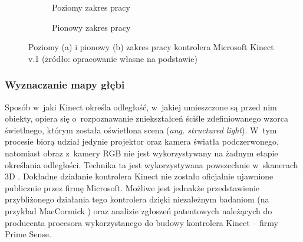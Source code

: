 \begin{savenotes}
	\begin{figure}[!htb]
		\centering
		\begin{subfigure}[b]{0.5\textwidth}
			\centering
			
			\caption{Poziomy zakres pracy}
			\label{fig:kinect:range:a}
		\end{subfigure} \hfill
		\begin{subfigure}[b]{0.6\textwidth}
			\centering
			
			\caption{Pionowy zakres pracy}
			\label{fig:kinect:range:b}
		\end{subfigure} \hfill
		\begin{subfigure}[p]{\textwidth}
			\hfill
			               
		\end{subfigure}
																									
		\caption[Poziomy i pionowy zakres pracy kontrolera Microsoft Kinect v.1]{Poziomy (a) i pionowy (b) zakres pracy kontrolera Microsoft Kinect v.1 (żródło: opracowanie własne na podstawie)}
		\label{fig:characteristics:kinect:range}	
	\end{figure}
\end{savenotes} 
																															
\subsubsection*{Wyznaczanie mapy głębi}
Sposób w~jaki Kinect określa odległość, w~jakiej umieszczone są przed nim obiekty, opiera się o~rozpoznawanie zniekształceń ściśle zdefiniowanego wzorca świetlnego, którym została oświetlona scena (\emph{ang. structured light}). W~tym procesie biorą udział jedynie projektor oraz kamera światła podczerwonego, natomiast obraz z~kamery RGB nie jest wykorzystywany na żadnym etapie określania odległości. Technika ta jest wykorzystywana powszechnie w~skanerach 3D {}. Dokładne działanie kontrolera Kinect nie zostało oficjalnie ujawnione publicznie przez firmę Microsoft. Możliwe jest jednakże przedstawienie przybliżonego działania tego kontrolera dzięki niezależnym badaniom (na przykład MacCormick \cite{MacCormick2011}) oraz analizie zgłoszeń patentowych \cite{patent:20080106746,patent:20100020078,patent:20100118123} należących do producenta procesora wykorzystanego do budowy kontrolera Kinect -- firmy Prime Sense.
																															
